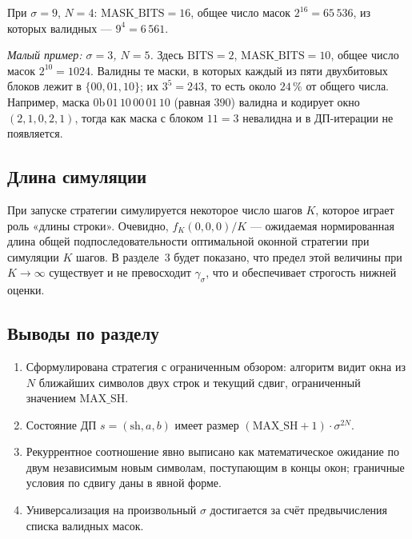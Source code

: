 При $\sigma = 9$, $N = 4$: $\mathrm{MASK\_BITS} = 16$, общее число масок $2^{16} = 65\,536$, из которых валидных --- $9^4 = 6\,561$.

\emph{Малый пример: $\sigma = 3$, $N = 5$.} Здесь $\mathrm{BITS} = 2$, $\mathrm{MASK\_BITS} = 10$, общее число масок $2^{10} = 1024$. Валидны те маски, в которых каждый из пяти двухбитовых блоков лежит в $\{00, 01, 10\}$; их $3^5 = 243$, то есть около $24\,\%$ от общего числа. Например, маска $\mathrm{0b}\,01\,10\,00\,01\,10$ (равная $390$) валидна и кодирует окно $(2, 1, 0, 2, 1)$, тогда как маска с блоком $11 = 3$ невалидна и в ДП-итерации не появляется.

\subsection{Длина симуляции}

При запуске стратегии симулируется некоторое число шагов $K$, которое играет роль «длины строки». Очевидно, $f_K(0, 0, 0) / K$ --- ожидаемая нормированная длина общей подпоследовательности оптимальной оконной стратегии при симуляции $K$ шагов. В разделе~3 будет показано, что предел этой величины при $K \to \infty$ существует и не превосходит $\gamma_\sigma$, что и обеспечивает строгость нижней оценки.

\subsection*{Выводы по разделу}

\begin{enumerate}
    \item Сформулирована стратегия с ограниченным обзором: алгоритм видит окна из $N$ ближайших символов двух строк и текущий сдвиг, ограниченный значением $\mathrm{MAX\_SH}$.
    \item Состояние ДП $s = (\mathrm{sh}, a, b)$ имеет размер $(\mathrm{MAX\_SH}+1) \cdot \sigma^{2N}$.
    \item Рекуррентное соотношение явно выписано как математическое ожидание по двум независимым новым символам, поступающим в концы окон; граничные условия по сдвигу даны в явной форме.
    \item Универсализация на произвольный $\sigma$ достигается за счёт предвычисления списка валидных масок.
\end{enumerate}
